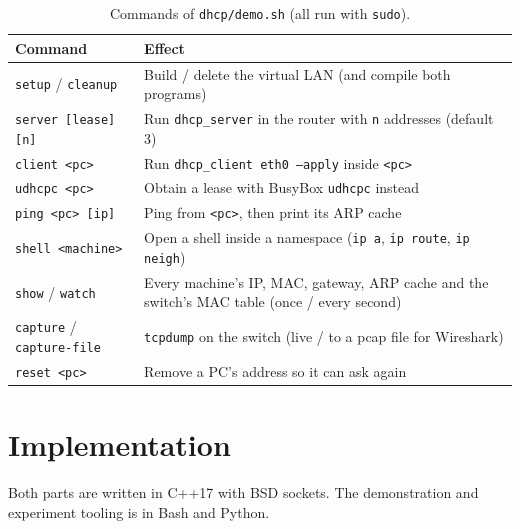 \documentclass[11pt]{article}
\begin{document}
\begin{table}[H]
\centering
\small
\begin{tabular}{lp{10.2cm}}
\toprule
\textbf{Command} & \textbf{Effect} \\
\midrule
\texttt{setup} / \texttt{cleanup} & Build / delete the virtual LAN (and compile both programs) \\
\texttt{server [lease] [n]} & Run \texttt{dhcp\_server} in the router with \texttt{n}
  addresses (default 3) \\
\texttt{client <pc>} & Run \texttt{dhcp\_client eth0 --apply} inside \texttt{<pc>} \\
\texttt{udhcpc <pc>} & Obtain a lease with BusyBox \texttt{udhcpc} instead \\
\texttt{ping <pc> [ip]} & Ping from \texttt{<pc>}, then print its ARP cache \\
\texttt{shell <machine>} & Open a shell inside a namespace (\texttt{ip a},
  \texttt{ip route}, \texttt{ip neigh}) \\
\texttt{show} / \texttt{watch} & Every machine's IP, MAC, gateway, ARP cache and the
  switch's MAC table (once / every second) \\
\texttt{capture} / \texttt{capture-file} & \texttt{tcpdump} on the switch (live / to a
  pcap file for Wireshark) \\
\texttt{reset <pc>} & Remove a PC's address so it can ask again \\
\bottomrule
\end{tabular}
\caption{Commands of \texttt{dhcp/demo.sh} (all run with \texttt{sudo}).}
\label{tab:demo}
\end{table}

\section{Implementation}
Both parts are written in C++17 with BSD sockets. The demonstration and experiment
tooling is in Bash and Python.
\end{document}
